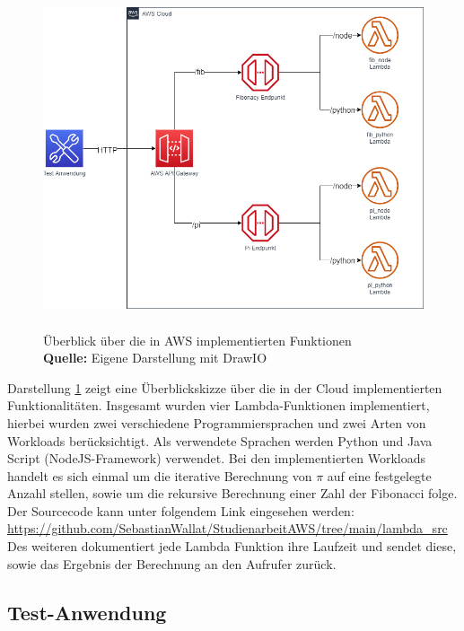 \documentclass[12pt,a4paper,parskip=half]{scrreprt}
\newcommand*{\captionsource}[2]{%
	\caption[{#1}]{%
		#1%
		\\\hspace{\linewidth}%
		\textbf{Quelle:} #2%
	}%
}
\begin{document}
\FloatBarrier
\begin{figure}[h!]
	\centering
	\includegraphics[width=14cm, height=10cm]{LambdaLayout}
	\captionsource{Überblick über die in AWS implementierten Funktionen}
	{Eigene Darstellung mit DrawIO}
	\label{Lambda_Aufbau}
\end{figure}

Darstellung \ref{Lambda_Aufbau} zeigt eine Überblickskizze über die in der Cloud implementierten Funktionalitäten. Insgesamt wurden vier Lambda-Funktionen implementiert, hierbei wurden zwei verschiedene Programmiersprachen und zwei Arten von Workloads berücksichtigt. Als verwendete Sprachen werden Python und Java Script (NodeJS-Framework) verwendet. Bei den implementierten Workloads handelt es sich einmal um die iterative Berechnung von $\pi$ auf eine festgelegte Anzahl stellen, sowie um die rekursive Berechnung einer Zahl der Fibonacci folge. Der Sourcecode kann unter folgendem Link eingesehen werden: \url{https://github.com/SebastianWallat/StudienarbeitAWS/tree/main/lambda_src}
\\
Des weiteren dokumentiert jede Lambda Funktion ihre Laufzeit und sendet diese, sowie das Ergebnis der Berechnung an den Aufrufer zurück.


\subsection{Test-Anwendung}
\end{document}

